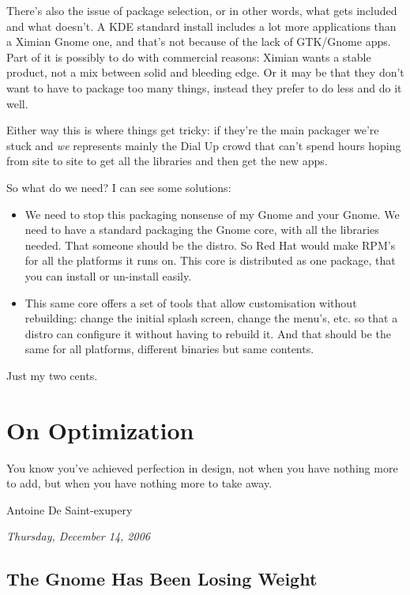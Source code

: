 \documentclass{book}
\begin{document}
There's also the issue of package selection, or in other words, what
gets included and what doesn't. A KDE standard install includes a lot
more applications than a Ximian Gnome one, and that's not because of
the lack of GTK/Gnome apps. Part of it is possibly to do with
commercial reasons: Ximian wants a stable product, not a mix between
solid and bleeding edge. Or it may be that they don't want to have to
package too many things, instead they prefer to do less and do it
well.

Either way this is where things get tricky: if they're the main
packager we're stuck and \emph{we} represents mainly the Dial Up crowd
that can't spend hours hoping from site to site to get all the
libraries and then get the new apps.

So what do we need? I can see some solutions:

\begin{itemize}
\item We need to stop this packaging nonsense of my Gnome and your
  Gnome. We need to have a standard packaging the Gnome core, with all
  the libraries needed. That someone should be the distro. So Red Hat
  would make RPM's for all the platforms it runs on. This core is
  distributed as one package, that you can install or un-install
  easily.
\item This same core offers a set of tools that allow customisation
  without rebuilding: change the initial splash screen, change the
  menu's, etc. so that a distro can configure it without having to
  rebuild it. And that should be the same for all platforms, different
  binaries but same contents.
\end{itemize}

Just my two cents.

\chapter{On Optimization}

\epigraph{You know you've achieved perfection in design, not when you
  have nothing more to add, but when you have nothing more to take
  away.}{Antoine De Saint-exupery}

\begin{flushright}
  \emph{Thursday, December 14, 2006}
\end{flushright}

\section{The Gnome Has Been Losing Weight}
\end{document}
